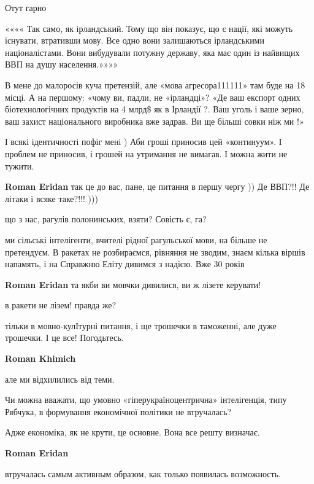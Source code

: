 \begin{itemize}

Отут гарно

«««« Так само, як ірландський. Тому що він показує, що є нації, які можуть
існувати, втративши мову. Все одно вони залишаються ірландськими
націоналістами. Вони вибудували потужну державу, яка має один із найвищих ВВП
на душу населення.»»»»

В мене до малоросів куча претензій, але «мова агресора111111» там буде на 18
місці. А на першому: «чому ви, падли, не «ірландці»? «Де ваш експорт одних
біотехнологічних продуктів на 4 млрд\$ як в Ірландії ?. Ваш уголь і ваше зерно,
ваш захист національного виробника вже задрав. Ви ще більші совки ніж ми !»

І всякі ідентичності пофіг мені ) Аби гроші приносив цей «континуум». І проблем
не приносив, і грошей на утримання не вимагав. І можна жити не тужити.

\begin{itemize} %
\textbf{Roman Eridan} так це до вас, пане, це питання в першу чергу ))
Де ВВП?!! Де літаки і всяке таке?!!! )))

що з нас, рагулів полонинських, взяти? Совість є, га?


ми сільські інтелігенти, вчителі рідної рагульської мови, на більше не
претендуєм. В ракетах не розбираємся, рівняння не зводим, знаєм кілька віршів
напамять, і на Справжню Еліту дивимся з надією. Вже 30 років


\textbf{Roman Eridan} та якби ви мовчки дивилися, ви ж лізете керувати!

в ракети не лізем! правда же?


тільки в мовно-кулІтурні питання, і ще трошечки в таможенні, але дуже трошечки.
І це все! Погодьтесь.

\textbf{Roman Khimich} 

але ми відхилились від теми.

Чи можна вважати, що умовно «гіперукраїноцентрична» інтелігенція, типу Рябчука,
в формування економічної політики не втручалась?

Адже економіка, як не крути, це основне. Вона все решту визначає.

\textbf{Roman Eridan} 

втручалась самым активным образом, как только появилась возможность.


\end{itemize}
\end{itemize}
